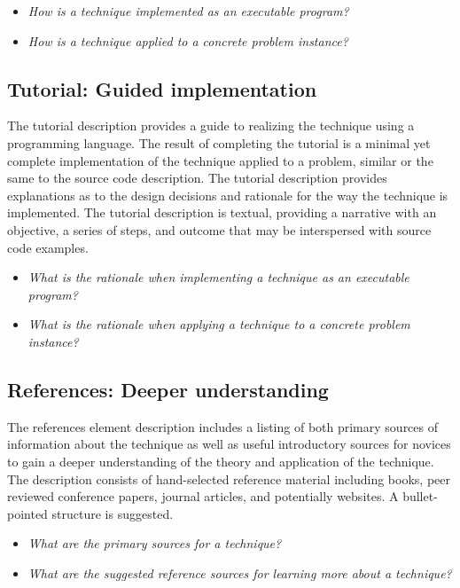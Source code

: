 \documentclass[a4paper, 11pt]{article}
\begin{document}
\begin{itemize}
	\item \emph{How is a technique implemented as an executable program?}
	\item \emph{How is a technique applied to a concrete problem instance?}
\end{itemize}

\subsection{Tutorial: Guided implementation}
The tutorial description provides a guide to realizing the technique using a programming language. The result of completing the tutorial is a minimal yet complete implementation of the technique applied to a problem, similar or the same to the source code description. The tutorial description provides explanations as to the design decisions and rationale for the way the technique is implemented. The tutorial description is textual, providing a narrative with an objective, a series of steps, and outcome that may be interspersed with source code examples.

\begin{itemize}
	\item \emph{What is the rationale when implementing a technique as an executable program?}
	\item \emph{What is the rationale when applying a technique to a concrete problem instance?}
\end{itemize}

\subsection{References: Deeper understanding}
The references element description includes a listing of both primary sources of information about the technique as well as useful introductory sources for novices to gain a deeper understanding of the theory and application of the technique. The description consists of hand-selected reference material including books, peer reviewed conference papers, journal articles, and potentially websites. A bullet-pointed structure is suggested. 

\begin{itemize}
	\item \emph{What are the primary sources for a technique?}
	\item \emph{What are the suggested reference sources for learning more about a technique?}
\end{itemize}
\end{document}
